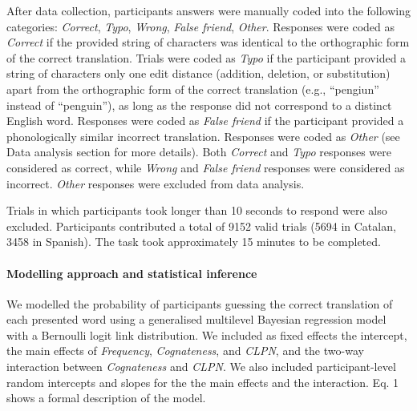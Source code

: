 \documentclass[
]{article}
\let\oldparagraph\paragraph
\renewcommand{\paragraph}[1]{\oldparagraph{#1}\mbox{}}
\begin{document}
After data collection, participants answers were manually coded into the
following categories: \emph{Correct}, \emph{Typo}, \emph{Wrong},
\emph{False friend}, \emph{Other}. Responses were coded as
\emph{Correct} if the provided string of characters was identical to the
orthographic form of the correct translation. Trials were coded as
\emph{Typo} if the participant provided a string of characters only one
edit distance (addition, deletion, or substitution) apart from the
orthographic form of the correct translation (e.g., ``pengiun'' instead
of ``penguin''), as long as the response did not correspond to a
distinct English word. Responses were coded as \emph{False friend} if
the participant provided a phonologically similar incorrect translation.
Responses were coded as \emph{Other} (see Data analysis section for more
details). Both \emph{Correct} and \emph{Typo} responses were considered
as correct, while \emph{Wrong} and \emph{False friend} responses were
considered as incorrect. \emph{Other} responses were excluded from data
analysis.

Trials in which participants took longer than 10 seconds to respond were
also excluded. Participants contributed a total of 9152 valid trials
(5694 in Catalan, 3458 in Spanish). The task took approximately 15
minutes to be completed.

\paragraph{Modelling approach and statistical
inference}\label{modelling-approach-and-statistical-inference}

We modelled the probability of participants guessing the correct
translation of each presented word using a generalised multilevel
Bayesian regression model with a Bernoulli logit link distribution. We
included as fixed effects the intercept, the main effects of
\emph{Frequency}, \emph{Cognateness}, and \emph{CLPN}, and the two-way
interaction between \emph{Cognateness} and \emph{CLPN}. We also included
participant-level random intercepts and slopes for the the main effects
and the interaction. Eq. 1 shows a formal description of the model.
\end{document}
